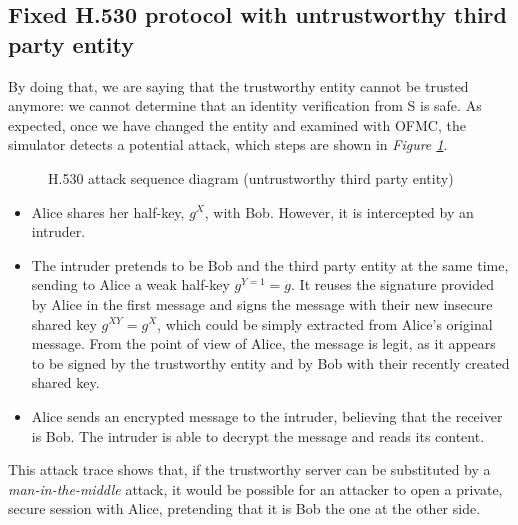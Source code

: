 \subsection{Fixed H.530 protocol with untrustworthy third party entity}\label{subsec:h5303}
By doing that, we are saying that the trustworthy entity cannot be trusted anymore: we cannot determine that an identity verification from S is safe.
As expected, once we have changed the entity and examined with OFMC, the simulator detects a potential attack, which steps are shown in \textit{Figure \ref{fig:h530traceS}}.
\begin{figure}[ht!]
	\centering	
	
	\caption{H.530 attack sequence diagram (untrustworthy third party entity)}
	\label{fig:h530traceS}
\end{figure}
\begin{itemize}
	\item	Alice shares her half-key, $g^{X}$, with Bob. However, it is intercepted by an intruder.
	\item	The intruder pretends to be Bob and the third party entity at the same time, sending to Alice a weak half-key $g^{Y=1}=g$. It reuses the signature provided by Alice in the first message and signs the message with their new insecure shared key $g^{XY}=g^X$, which could be simply extracted from Alice's original message. From the point of view of Alice, the message is legit, as it appears to be signed by the trustworthy entity and by Bob with their recently created shared key.
	\item	Alice sends an encrypted message to the intruder, believing that the receiver is Bob. The intruder is able to decrypt the message and reads its content.
\end{itemize}
This attack trace shows that, if the trustworthy server can be substituted by a \textit{man-in-the-middle} attack, it would be possible for an attacker to open a private, secure session with Alice, pretending that it is Bob the one at the other side.